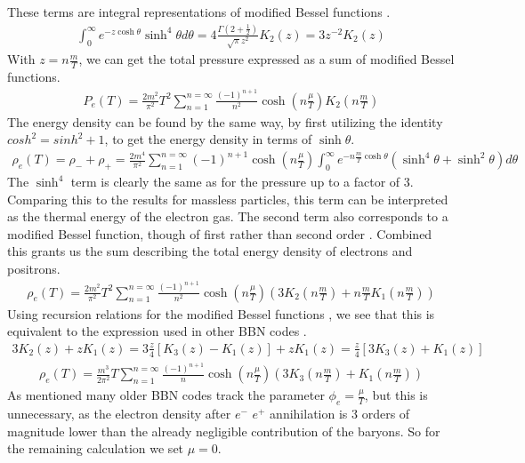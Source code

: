 These terms are integral representations of modified Bessel functions \cite[\href{https://dlmf.nist.gov/10.32.E8}{(10.32.8)}]{NIST:DLMF}.
\begin{align}
    \int_{0}^{\infty}e^{-z\cosh\theta}\sinh^4 \theta d\theta=4\frac{\Gamma(2+\frac{1}{2})}{\sqrt{\pi}z^2}K_2\left(z\right)=3z^{-2}K_2\left(z\right)
\end{align}
With $z=n\frac{m }{T}$, we can get the total pressure expressed as a sum of modified Bessel functions.
\begin{align}
    P_e(T)=\frac{2m^2}{\pi^2} T^2 \sum_{n=1}^{n=\infty} \frac{(-1)^{n+1}}{n^{2}} \cosh{\left(n\frac{\mu}{T}\right)}   K_2\left(n\frac{m }{T}\right)
    \label{eq:Pelectron}
\end{align}
The energy density can be found by the same way, by first utilizing the identity $cosh^2=sinh^2+1$, to get the energy density in terms of $\sinh\theta$.
\begin{align}
    \rho_e(T)=\rho_-+\rho_+=\frac{2m^4}{\pi^2}\sum_{n=1}^{n=\infty} (-1)^{n+1} \cosh{\left(n\frac{\mu}{T}\right)}  \int_{0}^{\infty}e^{-n\frac{m }{T}\cosh\theta}\left(\sinh^4\theta +\sinh^2\theta\right) d\theta
\end{align}
The $\sinh^4$ term is clearly the same as for the pressure up to a factor of 3. Comparing this to the results for massless particles, this term can be interpreted as the thermal energy of the electron gas. The second term also corresponds to a modified Bessel function, though of first rather than second order \cite[\href{https://dlmf.nist.gov/10.32.E8}{(10.32.8)}]{NIST:DLMF}. Combined this grants us the sum describing the total energy density of electrons and positrons.
\begin{align}
    \rho_e(T)=\frac{2m^2}{\pi^2} T^2 \sum_{n=1}^{n=\infty} \frac{(-1)^{n+1}}{n^{2}} \cosh{\left(n\frac{\mu}{T}\right)}  \left( 3 K_2\left(n\frac{m }{T}\right) + n\frac{m }{T} K_1\left(n\frac{m }{T}\right) \right)
    \label{eq:rhoelectron}
\end{align}
Using recursion relations for the modified Bessel functions \cite[\href{https://dlmf.nist.gov/10.29.E1}{(10.29.1)}]{NIST:DLMF}, we see that this is equivalent to the expression used in other BBN codes \cite{Kawano}.
\begin{align}
3K_{2}(z)+z K_{1}(z)=3\frac{z}{4}[K_{3}(z)-K_{1}(z)]+z K_{1}(z)=\frac{z}{4}[3K_{3}(z)+K_{1}(z)]
\end{align}
\begin{align}
    \rho_e(T)=\frac{m^3}{2\pi^2} T \sum_{n=1}^{n=\infty} \frac{(-1)^{n+1}}{n} \cosh{\left(n\frac{\mu}{T}\right)}  \left( 3 K_3\left(n\frac{m }{T}\right) + K_1\left(n\frac{m }{T}\right) \right)
\end{align}
As mentioned many older BBN codes track the parameter $\phi_e=\frac{\mu}{T}$, but this is unnecessary, as the electron density after $e^-$ $e^+$ annihilation is 3 orders of magnitude lower than the already negligible contribution of the baryons. So for the remaining calculation we set $\mu = 0$.

